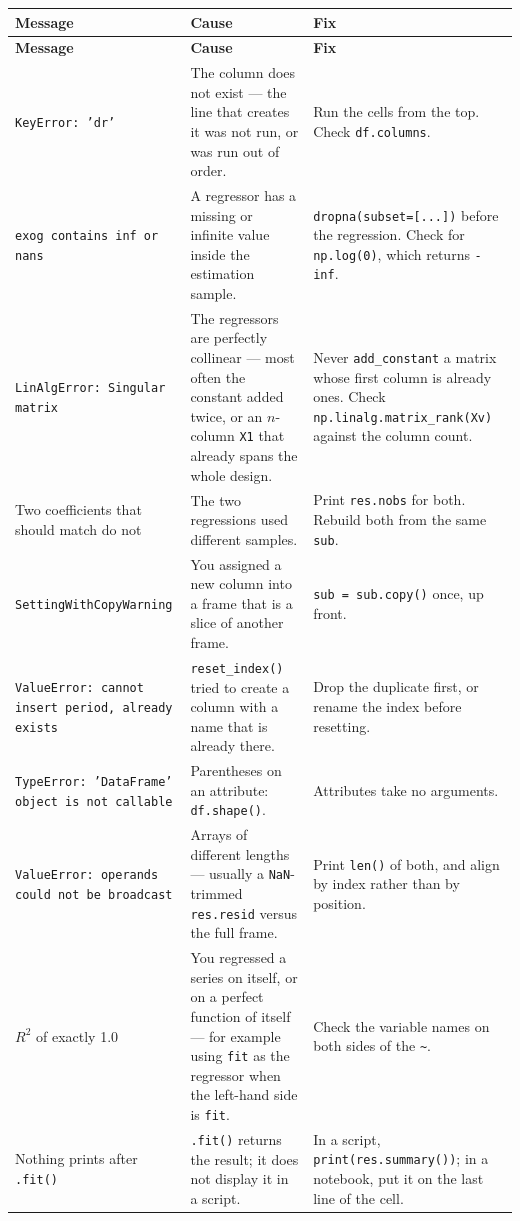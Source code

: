 \documentclass[11pt]{article}
\newcommand{\code}[1]{\texttt{#1}}
\begin{document}
\begin{center}
\begin{longtable}{@{}p{4.4cm}p{5.0cm}p{6.1cm}@{}}
\toprule
\textbf{Message} & \textbf{Cause} & \textbf{Fix} \\
\midrule
\endfirsthead
\toprule
\textbf{Message} & \textbf{Cause} & \textbf{Fix} \\
\midrule
\endhead
\code{KeyError: 'dr'} & The column does not exist --- the line that creates it
  was not run, or was run out of order. & Run the cells from the top. Check
  \code{df.columns}. \\
\code{exog contains inf or nans} & A regressor has a missing or infinite value
  inside the estimation sample. & \code{dropna(subset=[...])} before the
  regression. Check for \code{np.log(0)}, which returns \code{-inf}. \\
\code{LinAlgError: Singular matrix} & The regressors are perfectly collinear ---
  most often the constant added twice, or an $n$-column \code{X1} that already
  spans the whole design. & Never \code{add\_constant} a matrix whose first
  column is already ones. Check \code{np.linalg.matrix\_rank(Xv)} against the
  column count. \\
Two coefficients that should match do not & The two regressions used different
  samples. & Print \code{res.nobs} for both. Rebuild both from the same
  \code{sub}. \\
\code{SettingWithCopyWarning} & You assigned a new column into a frame that is a
  slice of another frame. & \code{sub = sub.copy()} once, up front. \\
\code{ValueError: cannot insert period, already exists} & \code{reset\_index()}
  tried to create a column with a name that is already there. & Drop the
  duplicate first, or rename the index before resetting. \\
\code{TypeError: 'DataFrame' object is not callable} & Parentheses on an
  attribute: \code{df.shape()}. & Attributes take no arguments. \\
\code{ValueError: operands could not be broadcast} & Arrays of different lengths
  --- usually a \code{NaN}-trimmed \code{res.resid} versus the full frame. &
  Print \code{len()} of both, and align by index rather than by position. \\
$R^2$ of exactly 1.0 & You regressed a series on itself, or on a perfect
  function of itself --- for example using \code{fit} as the regressor when the
  left-hand side is \code{fit}. & Check the variable names on both sides of the
  \code{\textasciitilde}. \\
Nothing prints after \code{.fit()} & \code{.fit()} returns the result; it does
  not display it in a script. & In a script, \code{print(res.summary())}; in a
  notebook, put it on the last line of the cell. \\
\bottomrule
\end{longtable}
\end{center}
\end{document}
